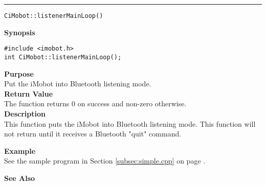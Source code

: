 \noindent
\vspace{5pt}
\rule{6.5in}{0.015in}
\noindent
{\LARGE \texttt{CiMobot::listenerMainLoop()}}\\
{}

\noindent
{\bf Synopsis}\\
\begin{verbatim}
#include <imobot.h>
int CiMobot::listenerMainLoop();
\end{verbatim}

\noindent
{\bf Purpose}\\
Put the iMobot into Bluetooth listening mode.\\

\noindent
{\bf Return Value}\\
The function returns 0 on success and non-zero otherwise.\\

\noindent
{\bf Description}\\
This function puts the iMobot into Bluetooth listening mode. This function will
not return until it receives a Bluetooth "quit" command.

\noindent
{\bf Example}\\
See the sample program in Section \ref{subsec:simple.cpp} on page \pageref{subsec:simple.cpp}.
\noindent

\noindent
{\bf See Also}\\

